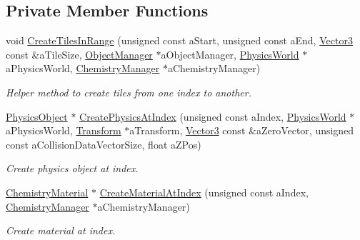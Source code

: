 \subsection*{Private Member Functions}
\begin{DoxyCompactItemize}
\item 
void \hyperlink{classTileMapGenerator_a67847204349df3bf1ef314181e9e7dc2}{Create\+Tiles\+In\+Range} (unsigned const a\+Start, unsigned const a\+End, \hyperlink{structVector3}{Vector3} const \&a\+Tile\+Size, \hyperlink{classObjectManager}{Object\+Manager} $\ast$a\+Object\+Manager, \hyperlink{classPhysicsWorld}{Physics\+World} $\ast$a\+Physics\+World, \hyperlink{classChemistryManager}{Chemistry\+Manager} $\ast$a\+Chemistry\+Manager)
\begin{DoxyCompactList}\small\item\em Helper method to create tiles from one index to another. \end{DoxyCompactList}\item 
\hyperlink{classPhysicsObject}{Physics\+Object} $\ast$ \hyperlink{classTileMapGenerator_a405b1fefe91d246977638af9f096ef84}{Create\+Physics\+At\+Index} (unsigned const a\+Index, \hyperlink{classPhysicsWorld}{Physics\+World} $\ast$a\+Physics\+World, \hyperlink{classTransform}{Transform} $\ast$a\+Transform, \hyperlink{structVector3}{Vector3} const \&a\+Zero\+Vector, unsigned const a\+Collision\+Data\+Vector\+Size, float a\+Z\+Pos)
\begin{DoxyCompactList}\small\item\em Create physics object at index. \end{DoxyCompactList}\item 
\hyperlink{classChemistryMaterial}{Chemistry\+Material} $\ast$ \hyperlink{classTileMapGenerator_aee320638476651610a5d2b79b481fd39}{Create\+Material\+At\+Index} (unsigned const a\+Index, \hyperlink{classChemistryManager}{Chemistry\+Manager} $\ast$a\+Chemistry\+Manager)
\begin{DoxyCompactList}\small\item\em Create material at index. \end{DoxyCompactList}\end{DoxyCompactItemize}
